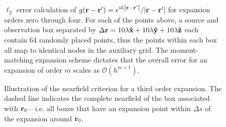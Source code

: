 \begin{figure}
  \centering
  
  \caption{\label{fig:grid convergence} $\ell_2$ error calculation of $g(\vb{r} - \vb{r}') = e^{i k \abs{\vb{r} - \vb{r}'}}/{\abs{\vb{r} - \vb{r}'}}$ for expansion orders zero through four.
    For each of the points above, a source and observation box separated by $\Delta \vb{r} = 10\lambda \vu{x} + 10 \lambda \vu{y} + 10 \lambda \vu{z}$ each contain 64 randomly placed points, thus the points within each box all map to identical nodes in the auxiliary grid.
    The moment-matching expansion scheme dictates that the overall error for an expansion of order $m$ scales as $\mathcal{O}(h^{m + 1})$.
  }
\end{figure}

\begin{figure}
  \centering
  
  \caption{\label{fig:nearfield criterion}Illustration of the nearfield criterion for a third order expansion.
    The dashed line indicates the complete nearfield of the box associated with \textcolor{cbblue}{$\vb{r}_0$}---i.e. all boxes that have an expansion point within $\Delta s$ of the expansion around \textcolor{cbblue}{$\vb{r}_0$}.
  }
\end{figure}

